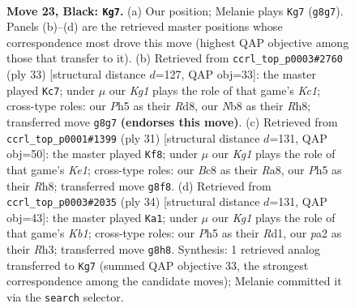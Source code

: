 \documentclass[11pt]{article}
\begin{document}
\clearpage

\begin{figure}[p]\centering
\begin{subfigure}{0.46\textwidth}\centering
\resizebox{\linewidth}{!}{%
\newchessgame
\chessboard[
  setfen={rnb3k1/1p1nb3/p2rppp1/7p/4B3/1P2P1P1/P1pNPK1P/R1B1R3 b - - 3 23},
  showmover=false,
  pgfstyle=straightmove, color=movearrow, markmove={g8-g7}
]}
\caption{}
\end{subfigure}\hfill
\begin{subfigure}{0.46\textwidth}\centering
\resizebox{\linewidth}{!}{%
\newchessgame
\chessboard[
  setfen={2kr3r/1p1nppb1/p2p3p/4nPp1/4N3/1P4BP/1PP2PP1/2KR1B1R b - - 2 17},
  showmover=false,
  pgfstyle=straightmove, color=movearrow, markmove={c8-c7}
]}
\caption{}
\end{subfigure}
\\[4pt]
\begin{subfigure}{0.46\textwidth}\centering
\resizebox{\linewidth}{!}{%
\newchessgame
\chessboard[
  setfen={r3k2r/1pB1b1pp/p4p2/2n2b2/P1Bp4/N7/1PP2PPP/R3R1K1 b kq - 0 16},
  showmover=false,
  pgfstyle=straightmove, color=movearrow, markmove={e8-f8}
]}
\caption{}
\end{subfigure}\hfill
\begin{subfigure}{0.46\textwidth}\centering
\resizebox{\linewidth}{!}{%
\newchessgame
\chessboard[
  setfen={1r2kb1r/3n1pp1/p3p2p/3b4/2pN2PP/P3BP1R/1PP5/1K1R1B2 w k - 2 18},
  showmover=false,
  pgfstyle=straightmove, color=movearrow, markmove={b1-a1}
]}
\caption{}
\end{subfigure}
\caption{\textbf{Move 23, Black: \texttt{Kg7}.} (a) Our position; Melanie plays \texttt{Kg7} (\texttt{g8g7}). Panels (b)--(d) are the retrieved master positions whose correspondence most drove this move (highest QAP objective among those that transfer to it). (b) Retrieved from \texttt{ccrl\_top\_p0003\#2760} (ply 33) [structural distance $d$=127, QAP obj=33]: the master played \texttt{Kc7}; under $\mu$ our \emph{Kg1} plays the role of that game's \emph{Kc1}; cross-type roles: our \emph{P}h5 as their \emph{R}d8, our \emph{N}b8 as their \emph{R}h8; transferred move \texttt{g8g7} \textbf{(endorses this move)}. (c) Retrieved from \texttt{ccrl\_top\_p0001\#1399} (ply 31) [structural distance $d$=131, QAP obj=50]: the master played \texttt{Kf8}; under $\mu$ our \emph{Kg1} plays the role of that game's \emph{Ke1}; cross-type roles: our \emph{B}c8 as their \emph{R}a8, our \emph{P}h5 as their \emph{R}h8; transferred move \texttt{g8f8}. (d) Retrieved from \texttt{ccrl\_top\_p0003\#2035} (ply 34) [structural distance $d$=131, QAP obj=43]: the master played \texttt{Ka1}; under $\mu$ our \emph{Kg1} plays the role of that game's \emph{Kb1}; cross-type roles: our \emph{P}h5 as their \emph{R}d1, our \emph{p}a2 as their \emph{R}h3; transferred move \texttt{g8h8}. Synthesis: 1 retrieved analog transferred to \texttt{Kg7} (summed QAP objective 33, the strongest correspondence among the candidate moves); Melanie committed it via the \texttt{search} selector.}
\label{fig:thought-m45}
\end{figure}
\end{document}
